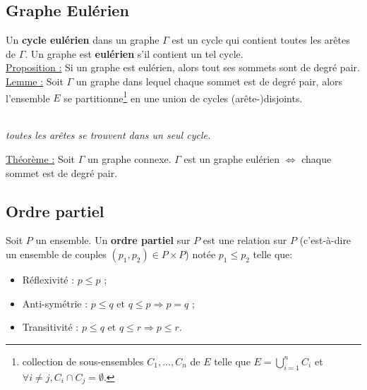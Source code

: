 \documentclass[11pt]{article}
\begin{document}
	\subsection{Graphe Eulérien}
		Un \textbf{cycle eulérien} dans un graphe $\Gamma$ est un cycle qui contient toutes les arêtes de $\Gamma$. Un graphe est \textbf{eulérien} s'il contient un tel cycle.\\
		
		\underline{Proposition :} Si un graphe est eulérien, alors tout ses sommets sont de degré pair.\\
		
		\underline{Lemme :} Soit $\Gamma$ un graphe dans lequel chaque sommet est de degré pair, alors l'ensemble $E$ se partitionne\footnote{collection de sous-ensembles $C_1, ..., C_n$ de $E$ telle que $E=\displaystyle\bigcup^n_{i=1} C_i$ et $\forall i \neq j, C_i \cap C_j = \emptyset$.} en une union de cycles (arête-)disjoints.\\
		\begin{center}
			 \\
				\textit{toutes les arêtes se trouvent dans un seul cycle.}
			\end{center} 
			
	\underline{Théorème :}  Soit $\Gamma$ un graphe connexe. $\Gamma$ est un graphe eulérien $\Leftrightarrow$ chaque sommet est de degré pair.

	\subsection{Ordre partiel}
		Soit $P$ un ensemble. Un \textbf{ordre partiel} sur $P$ est une relation sur $P$ (c'est-à-dire un ensemble de couples $(p_1,p_2) \in P \times P$) notée $p_1 \leq p_2$ telle que:
		\begin{itemize}
			\item Réflexivité : $p \leq p$ ;
			\item Anti-symétrie : $p \leq q$ et $q \leq p \Rightarrow p = q$ ;
			\item Transitivité : $p \leq q$ et $q \leq r \Rightarrow p \leq r$.
		\end{itemize}
\end{document}
